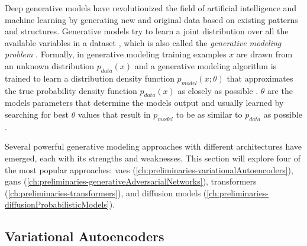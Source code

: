Deep generative models have revolutionized the field of artificial intelligence and machine learning by generating new and original data based on existing patterns and structures. 
Generative models try to learn a joint distribution over all the available variables in a dataset \cite{kingma2019IntroductionVariationalAutoencoders}, which is also called the \textit{generative modeling problem} \cite{goodfellow2020GenerativeAdversarialNetworks}.
Formally, in generative modeling training examples $x$ are drawn from an unknown distribution $p_{data}(x)$ and a generative modeling algorithm is trained to learn a distribution density function $p_{model}(x;\theta)$ that approximates the true probability density function $p_{data}(x)$ as closely as possible \cite[p. 139]{goodfellow2020GenerativeAdversarialNetworks}.
$\theta$ are the models parameters that determine the models output and usually learned by searching for best $\theta$ values that result in $p_{model}$ to be as similar to $p_{data}$ as possible \cite[p. 139]{goodfellow2020GenerativeAdversarialNetworks}.

Several powerful generative modeling approaches with different architectures have emerged, each with its strengths and weaknesses. 
This section will explore four of the most popular approaches: \glspl{vae} (\autoref{ch:preliminaries-variationalAutoencoders}), \glspl{gan} (\autoref{ch:preliminaries-generativeAdversarialNetworks}), transformers (\autoref{ch:preliminaries-transformers}), and diffusion models (\autoref{ch:preliminaries-diffusionProbabilisticModels}). 

\subsection{Variational Autoencoders}
\label{ch:preliminaries-variationalAutoencoders} 

